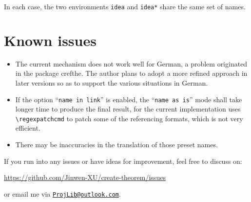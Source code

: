 \documentclass[classical]{einfart}
\newcommand{\packageoption}[1]{\texttt{\textcolor{black!67!green}{#1}}}
\begin{document}
\smallskip
In each case, the two environments \texttt{idea} and \texttt{idea*} share the same set of names.


\section{Known issues}

\begin{itemize}
    \item The current mechanism does not work well for German, a problem originated in the package \textsf{crefthe}. The author plans to adopt a more refined approach in later versions so as to support the various situations in German.
    \item If the option ``\packageoption{name in link}'' is enabled, the ``\packageoption{name as is}'' mode shall take longer time to produce the final result, for the current implementation uses \lstinline|\regexpatchcmd| to patch some of the referencing formats, which is not very efficient.
    \item There may be inaccuracies in the translation of those preset names.
\end{itemize}

\medskip
If you run into any issues or have ideas for improvement, feel free to discuss on:
\begin{center}
    \url{https://github.com/Jinwen-XU/create-theorem/issues}
\end{center}
or email me via \href{mailto:ProjLib@outlook.com}{\texttt{ProjLib@outlook.com}}.
\end{document}

